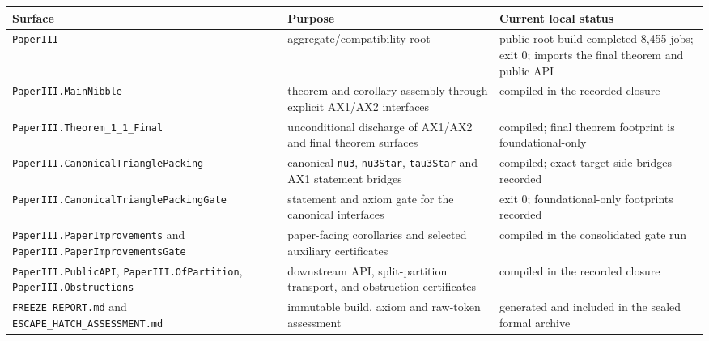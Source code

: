 \documentclass[english,11pt,a4paper]{article}
\newcounter{none}
\begin{document}
{\def\LTcaptype{none} %
\begin{longtable}[]{@{}
  >{\raggedright\arraybackslash}p{}
  >{\raggedright\arraybackslash}p{}
  >{\raggedright\arraybackslash}p{}@{}}
\toprule\noalign{}
\begin{minipage}[b]{\linewidth}\raggedright
Surface
\end{minipage} & \begin{minipage}[b]{\linewidth}\raggedright
Purpose
\end{minipage} & \begin{minipage}[b]{\linewidth}\raggedright
Current local status
\end{minipage} \\
\midrule\noalign{}
\endhead
\bottomrule\noalign{}
\endlastfoot
\nolinkurl{PaperIII} & aggregate/compatibility root & public-root build
completed 8,455 jobs; exit 0; imports the final theorem and public
API \\
\nolinkurl{PaperIII.MainNibble} & theorem and corollary assembly through
explicit AX1/AX2 interfaces & compiled in the recorded closure \\
\nolinkurl{PaperIII.Theorem_1_1_Final} & unconditional discharge of
AX1/AX2 and final theorem surfaces & compiled; final theorem footprint
is foundational-only \\
\nolinkurl{PaperIII.CanonicalTrianglePacking} & canonical \nolinkurl{nu3},
\nolinkurl{nu3Star}, \nolinkurl{tau3Star} and AX1 statement bridges &
compiled; exact target-side bridges recorded \\
\nolinkurl{PaperIII.CanonicalTrianglePackingGate} & statement and axiom
gate for the canonical interfaces & exit 0; foundational-only footprints
recorded \\
\nolinkurl{PaperIII.PaperImprovements} and
\nolinkurl{PaperIII.PaperImprovementsGate} & paper-facing corollaries and
selected auxiliary certificates & compiled in the consolidated gate
run \\
\nolinkurl{PaperIII.PublicAPI}, \nolinkurl{PaperIII.OfPartition},
\nolinkurl{PaperIII.Obstructions} & downstream API, split-partition
transport, and obstruction certificates & compiled in the recorded
closure \\
\nolinkurl{FREEZE_REPORT.md} and \nolinkurl{ESCAPE_HATCH_ASSESSMENT.md} &
immutable build, axiom and raw-token assessment & generated and included
in the sealed formal archive \\
\end{longtable}
}
\end{document}
